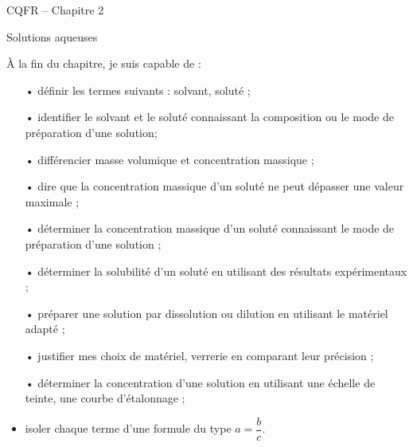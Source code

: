 

\cfoot{} %



\begin{header}
CQFR -- Chapitre 2

Solutions aqueuses
\end{header}

À la fin du chapitre, je suis capable de :
\begin{itemize}
\item[•] définir les termes suivants : solvant, soluté ;
\item[•] identifier le solvant et le soluté connaissant la composition ou le mode de préparation d'une solution;
\item[•] différencier masse volumique et concentration massique ;
\item[•] dire que la concentration massique d'un soluté ne peut dépasser une valeur maximale ;
\item[•] déterminer la concentration massique d'un soluté connaissant le mode de préparation d'une solution ;
\item[•] déterminer la solubilité d'un soluté en utilisant des résultats expérimentaux ;
\item[•] préparer une solution par dissolution ou dilution en utilisant le matériel adapté ;
\item[•] justifier mes choix de matériel, verrerie en comparant leur précision ;
\item[•] déterminer la concentration d'une solution en utilisant une échelle de teinte, une courbe d'étalonnage ;
\item isoler chaque terme d'une formule du type $a=\dfrac{b}{c}$.
\end{itemize}

